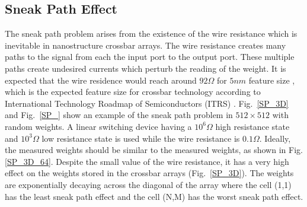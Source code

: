\documentclass[english]{article}
\newcommand{\reffig}[1]{{Fig.~\ref{#1}}}
\renewcommand{\cite}{\citep}
\begin{document}

\subsection{Sneak Path Effect}
The sneak path problem arises from the existence of the wire resistance which is inevitable in nanostructure crossbar arrays. The wire resistance creates many paths to the signal from each the input port to the output port. These multiple paths create undesired currents which perturb the reading of the weight. It is expected that the wire residence would reach around $92\Omega$ for $5nm$ feature size \cite{fouda2018modeling}, which is the expected feature size for crossbar technology according to International Technology Roadmap of Semiconductors (ITRS) \cite{wilson2013international}. \reffig{SP_3D} and \reffig{SP_} show an example of the sneak path problem in $512 \times 512$ with random weights. A linear switching device having a $10^6\Omega$ high resistance state and $10^3\Omega$ low resistance state is used while the wire resistance is $0.1\Omega$. Ideally, the measured weights should be similar to the measured weights, as shown in Fig. \ref{SP_3D_64}. Despite the small value of the wire resistance, it has a very high effect on the weights stored in the crossbar arrays (\reffig{SP_3D}). The weights are exponentially decaying across the diagonal of the array where the cell (1,1) has the least sneak path effect and the cell (N,M) has the worst sneak path effect. 
\end{document}
